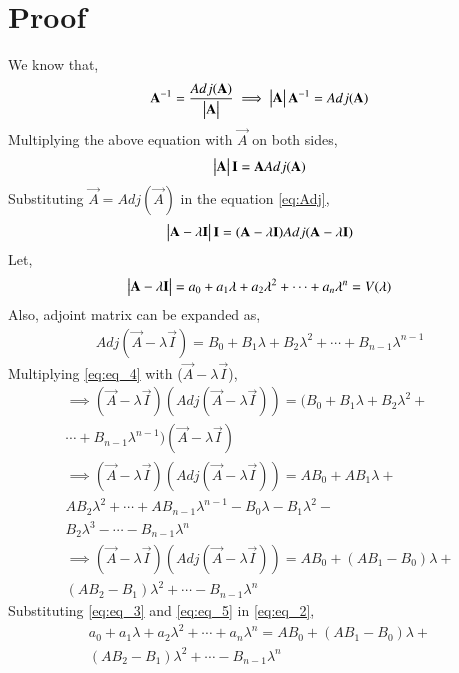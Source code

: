 \documentclass[journal,12pt,twocolumn]{IEEEtran}
\begin{document}
\section{Proof}
We know that,
\begin{align}
    \mathbf{A}^{-1}=\frac{Adj(\mathbf{A})}{\begin{vmatrix}\mathbf{A}\end{vmatrix}} 
    \implies \begin{vmatrix}\mathbf{A}\end{vmatrix} \mathbf{A}^{-1} = Adj(\mathbf{A}) \nonumber
\end{align}
Multiplying the above equation with $\vec{A}$ on both sides,
\begin{align} \label{eq:Adj}
    \begin{vmatrix}\mathbf{A}\end{vmatrix}\mathbf{I} = \mathbf{A}Adj(\mathbf{A})
\end{align}
Substituting $\vec{A} = Adj(\vec{A})$ in the equation \eqref{eq:Adj},
\begin{align} \label{eq:eq_2}
    \begin{vmatrix}\mathbf{A}-\lambda \mathbf{I}\end{vmatrix}\mathbf{I} = (\mathbf{A}-\lambda \mathbf{I}) Adj(\mathbf{A}-\lambda \mathbf{I})
\end{align}
Let,
\begin{align} \label{eq:eq_3}
    \begin{vmatrix}\mathbf{A}-\lambda \mathbf{I}\end{vmatrix} = a_0+a_1\lambda+a_2\lambda^2+\cdots+a_n\lambda^n = V(\lambda)
\end{align}
Also, adjoint matrix can be expanded as,
\begin{align} \label{eq:eq_4}
    Adj(\vec{A}-\lambda \vec{I}) = B_0 + B_1\lambda + B_2 \lambda^2 + \cdots + B_{n-1} \lambda^{n-1}
\end{align}
Multiplying \eqref{eq:eq_4} with ($\vec{A}-\lambda \vec{I}$),
\begin{align} \label{eq:eq_5}
    \implies (\vec{A}-\lambda \vec{I})(Adj(\vec{A}-\lambda \vec{I})) = (B_0 + B_1\lambda + B_2 \lambda^2+  \nonumber \\ 
    \cdots + B_{n-1} \lambda^{n-1})(\vec{A}-\lambda \vec{I}) \nonumber \\
    \implies (\vec{A}-\lambda \vec{I})(Adj(\vec{A}-\lambda \vec{I})) = AB_0 + AB_1 \lambda +
    \nonumber \\ AB_2 \lambda^2+\cdots+AB_{n-1} \lambda^{n-1} - B_0 \lambda - B_1 \lambda^2 -
    \nonumber \\ B_2 \lambda^3- \cdots-B_{n-1} \lambda^n \nonumber \\
    \implies (\vec{A}-\lambda \vec{I})(Adj(\vec{A}-\lambda \vec{I})) = AB_0 + (AB_1-B_0)\lambda + \nonumber \\ (AB_2-B_1)\lambda^2 + \cdots - B_{n-1}\lambda^n
\end{align}
Substituting \eqref{eq:eq_3} and \eqref{eq:eq_5} in \eqref{eq:eq_2},
\begin{align} \label{eq:eq_6}
    a_0+a_1\lambda+a_2\lambda^2+\cdots+a_n\lambda^n = AB_0 + (AB_1-B_0)\lambda + \nonumber \\ (AB_2-B_1)\lambda^2 + \cdots - B_{n-1}\lambda^n
\end{align}
\end{document}
